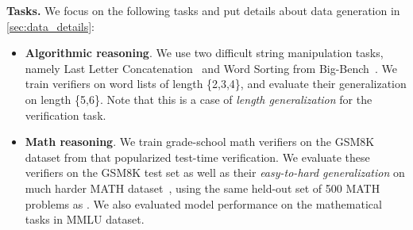 




\textbf{Tasks.} We focus on the following tasks and put details about data generation in \autoref{sec:data_details}:
\begin{itemize}[leftmargin=15pt,topsep=1pt,partopsep=1ex,parsep=1ex,itemsep=0pt]
    \item \textbf{Algorithmic reasoning}. We use two difficult string manipulation tasks, namely Last Letter Concatenation~\citep{wei2022chain}
    and Word Sorting from Big-Bench~\citep{suzgun2022challenging}. We train verifiers on  word lists of length \{2,3,4\}, and evaluate their generalization on length \{5,6\}. Note that this is a case of \textit{length generalization} for the verification task.
    \item \textbf{Math reasoning}. We train grade-school math verifiers on the GSM8K dataset from \citet{cobbe2021training} that popularized test-time verification. We evaluate these verifiers on the GSM8K test set as well as their \emph{easy-to-hard generalization} on much harder MATH dataset~\citep{hendrycks2021measuring}, using the same held-out set of 500 MATH problems as \citet{lightman2023let}. We also evaluated model performance on the mathematical tasks in MMLU \citep{mmlu} dataset.
\end{itemize} 

